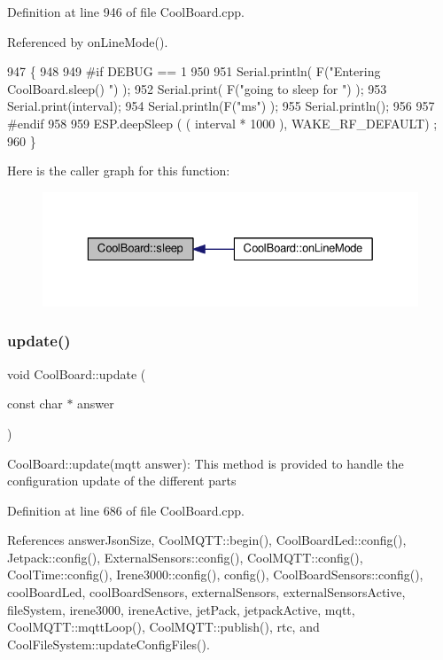 Definition at line 946 of file Cool\+Board.\+cpp.



Referenced by on\+Line\+Mode().


\begin{DoxyCode}
947 \{
948 
949 \textcolor{preprocessor}{#if DEBUG == 1}
950 
951     Serial.println( F(\textcolor{stringliteral}{"Entering CoolBoard.sleep() "}) );
952     Serial.print( F(\textcolor{stringliteral}{"going to sleep for "}) );
953     Serial.print(interval);
954     Serial.println(F(\textcolor{stringliteral}{"ms"}) );
955     Serial.println();
956 
957 \textcolor{preprocessor}{#endif}
958 
959     ESP.deepSleep ( ( interval * 1000 ), WAKE\_RF\_DEFAULT) ;
960 \}
\end{DoxyCode}
Here is the caller graph for this function\+:
\nopagebreak
\begin{figure}[H]
\begin{center}
\leavevmode
\includegraphics[width=329pt]{classCoolBoard_a5d0c8ff93b615efd676be432de9f164a_icgraph}
\end{center}
\end{figure}
\mbox{\label{classCoolBoard_a8612756d3f73198cdde857a66f0fe690}} 
\subsubsection{\texorpdfstring{update()}{update()}}
{\footnotesize\ttfamily void Cool\+Board\+::update (\begin{DoxyParamCaption}\item[{const char $\ast$}]{answer }\end{DoxyParamCaption})}

Cool\+Board\+::update(mqtt answer)\+: This method is provided to handle the configuration update of the different parts 

Definition at line 686 of file Cool\+Board.\+cpp.



References answer\+Json\+Size, Cool\+M\+Q\+T\+T\+::begin(), Cool\+Board\+Led\+::config(), Jetpack\+::config(), External\+Sensors\+::config(), Cool\+M\+Q\+T\+T\+::config(), Cool\+Time\+::config(), Irene3000\+::config(), config(), Cool\+Board\+Sensors\+::config(), cool\+Board\+Led, cool\+Board\+Sensors, external\+Sensors, external\+Sensors\+Active, file\+System, irene3000, irene\+Active, jet\+Pack, jetpack\+Active, mqtt, Cool\+M\+Q\+T\+T\+::mqtt\+Loop(), Cool\+M\+Q\+T\+T\+::publish(), rtc, and Cool\+File\+System\+::update\+Config\+Files().



